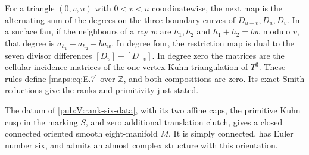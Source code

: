 \begin{remark}
For a triangle $(0,v,u)$ with $0<v<u$ coordinatewise, the next map
is the alternating sum of the degrees on the three boundary curves
of $D_{u-v},D_u,D_v$.  In a surface fan, if the neighbours of a ray
$w$ are $h_1,h_2$ and $h_1+h_2=bw$ modulo $v$, that degree is
$a_{h_1}+a_{h_2}-ba_w$.  In degree four, the restriction map is dual
to the seven divisor differences $[D_v]-[D_{-v}]$.  In degree zero
the matrices are the cellular incidence matrices of the one-vertex
Kuhn triangulation of $T^3$.  These rules define \eqref{maps:eq:E.7} over
$\mathbb Z$, and both compositions are zero.
Its exact Smith reductions give the ranks and primitivity just stated.


\end{remark}

\begin{lemma}
\hypertarget{tag-PV11}{}\label{pub:V:smooth-gluing}
The datum of \cref{pub:V:rank-six-data}, with its two affine caps,
the primitive Kuhn cusp in the marking $S$, and zero additional
translation clutch, gives a closed connected oriented smooth
eight-manifold $M$. It is simply connected, has Euler number six,
and admits an almost complex structure with this orientation.
\end{lemma}
